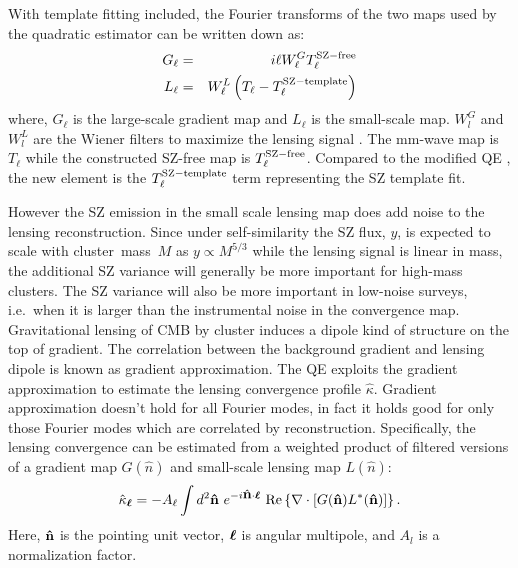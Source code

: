 With template fitting included, the Fourier transforms of the two maps used by the quadratic estimator can be written down as:
\begin{eqnarray}
G_{\ell} &=& i\ell W^{G}_{\ell} T^{\rm SZ-free}_{\ell}\\
L_{\ell} &=& W^{L}_{\ell} \left(T_{\ell} - T_\ell^{\rm SZ-template}\right)
\end{eqnarray}
where, $G_{\ell}$ is the large-scale gradient map and $L_{\ell}$ is the small-scale map. 
$W^{G}_{l}$ and $W^{L}_{l} $ are the Wiener filters to maximize the lensing signal \cite{hu07}. 
The mm-wave map is $T_{\ell}$ while the constructed SZ-free map is $T^{\rm SZ-free}_{\ell}$. 
Compared to the modified QE \citep{madhavacheril18,raghunathan18}, the new element is the $T_\ell^{\rm SZ-template}$ term representing the SZ template fit. 





However the SZ emission in the small scale lensing map does add noise to the lensing reconstruction. 
Since under self-similarity the SZ flux, $y$, is expected to scale with  \mbox{cluster mass $M$} as $y \propto M^{5/3}$ while the lensing signal is linear in mass, the additional SZ variance will generally be more important for high-mass clusters. 
The SZ variance will also be more important in low-noise surveys, i.e.~when it is larger than the instrumental noise in the convergence map.%
 Gravitational lensing of CMB by cluster induces a dipole kind of structure on the top of gradient.
 The correlation between the background gradient and lensing dipole is known as gradient approximation.    
The QE \citep{hu02a} exploits the gradient approximation to estimate the lensing convergence profile $\hat{\kappa}$. 
 Gradient approximation doesn't hold for all Fourier modes, in fact it holds good for only those Fourier modes which are correlated by reconstruction. 
 Specifically, the lensing convergence can be estimated from a weighted product of filtered versions of a gradient map $G(\hat{n})$ and  small-scale lensing map $L(\hat{n})$: 
\begin{equation}
\hat{\kappa}_{\bm{\ell}} =-A_{\ell}\int d^{2}\bm{\hat{\mbox{n}}}\ e^{-i\bm{\hat{\mbox{n}}}\cdot\bm{\ell}}\ {\rm Re} \left\{ \nabla \cdot \left[ G(\bm{\hat{\mbox{n}}}) L^{*}(\bm{\hat{\mbox{n}}})\right]\right\}.
\label{eq_QE_kappa}
\end{equation} 
Here, $\bm{\hat{\mbox{n}}}$ is the pointing unit vector, $\bm{\ell}$ is angular multipole, and $A_{l}$ is a normalization factor. 

